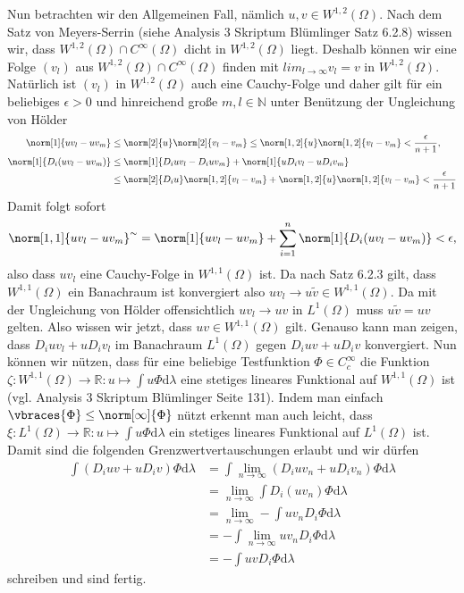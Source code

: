 \begin{solution}
Nun betrachten wir den Allgemeinen Fall, nämlich $u,v\in W^{1,2}(\Omega)$. Nach dem Satz von Meyers-Serrin (siehe Analysis 3 Skriptum Blümlinger Satz 6.2.8) wissen wir, dass $W^{1,2}(\Omega)\cap C^\infty(\Omega)$ dicht in $W^{1,2}(\Omega)$ liegt. Deshalb können wir eine Folge $(v_l)$ aus $W^{1,2}(\Omega)\cap C^\infty(\Omega)$ finden mit $lim_{l\to\infty}v_l=v$ in $W^{1,2}(\Omega)$. Natürlich ist $(v_l)$ in $W^{1,2}(\Omega)$ auch eine Cauchy-Folge und daher gilt für ein beliebiges $\epsilon>0$ und hinreichend große $m,l\in\mathbb{N}$ unter Benützung der Ungleichung von Hölder
\begin{align*}
    \norm[1]{uv_l-uv_m}&\leq\norm[2]{u}\norm[2]{v_l-v_m}\leq\norm[1,2]{u}\norm[1,2]{v_l-v_m}<\frac{\epsilon}{n+1},\\
    \norm[1]{D_i(uv_l-uv_m)}&\leq\norm[1]{D_iuv_l-D_iuv_m}+\norm[1]{uD_iv_l-uD_iv_m}\\
    &\leq\norm[2]{D_iu}\norm[1,2]{v_l-v_m}+\norm[1,2]{u}\norm[1,2]{v_l-v_m}<\frac{\epsilon}{n+1}
\end{align*}
Damit folgt sofort
\begin{align*}
    \norm[1,1]{uv_l-uv_m}^\sim=\norm[1]{uv_l-uv_m}+\sum_{i=1}^n\norm[1]{D_i(uv_l-uv_m)}<\epsilon,
\end{align*}
also dass $uv_l$ eine Cauchy-Folge in $W^{1,1}(\Omega)$ ist. Da nach Satz 6.2.3 gilt, dass $W^{1,1}(\Omega)$ ein Banachraum ist konvergiert also $uv_l\to u\tilde{v}\in W^{1,1}(\Omega)$. Da mit der Ungleichung von Hölder offensichtlich $uv_l\to uv$ in $L^1(\Omega)$ muss $u\tilde{v}=uv$ gelten. Also wissen wir jetzt, dass $uv\in W^{1,1}(\Omega)$ gilt. Genauso kann man zeigen, dass $D_iuv_l+uD_iv_l$ im Banachraum $L^1(\Omega)$ gegen $D_iuv+uD_iv$ konvergiert. Nun können wir nützen, dass für eine beliebige Testfunktion $\Phi \in C_c^\infty$ die Funktion $\zeta:W^{1,1}(\Omega)\to\mathbb{R}:u\mapsto\int u\Phi\mathrm{d}\lambda$ eine stetiges lineares Funktional auf $W^{1,1}(\Omega)$ ist (vgl. Analysis 3 Skriptum Blümlinger Seite 131). Indem man einfach $\vbraces{\Phi}\leq\norm[\infty]{\Phi}$ nützt erkennt man auch leicht, dass $\xi:L^1(\Omega)\to\mathbb{R}:u\mapsto\int u\Phi\mathrm{d}\lambda$ ein stetiges lineares Funktional auf $L^1(\Omega)$ ist. Damit sind die folgenden Grenzwertvertauschungen erlaubt und wir dürfen
\begin{align*}
    \int (D_iuv+uD_iv)\Phi\mathrm{d}\lambda&=\int \lim_{n\to\infty}(D_iuv_n+uD_iv_n)\Phi\mathrm{d}\lambda\\
    &=\lim_{n\to\infty}\int D_i(uv_n)\Phi\mathrm{d}\lambda\\
    &=\lim_{n\to\infty}-\int uv_nD_i\Phi\mathrm{d}\lambda\\
    &=-\int\lim_{n\to\infty}uv_nD_i\Phi\mathrm{d}\lambda\\
    &=-\int uvD_i\Phi\mathrm{d}\lambda
\end{align*}
schreiben und sind fertig.
\end{solution}
